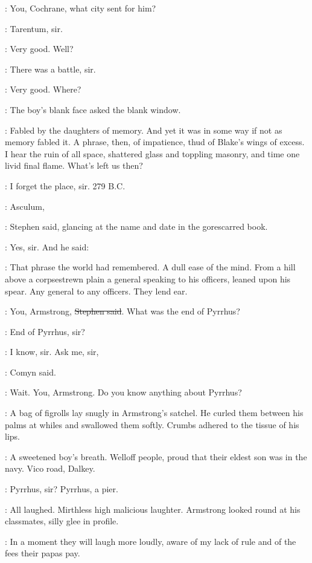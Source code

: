 \Stephen:
You, Cochrane, what city sent for him?

\cochrane:
Tarentum, sir.

\Stephen:
Very good. Well?

\cochrane:
There was a battle, sir.

\Stephen:
Very good.
Where?

:
The boy's blank face asked the blank window.

\StephenInt:
Fabled by the daughters of memory.
And yet it was in some way if not as memory fabled it.
A phrase, then, of impatience, thud of Blake's wings of excess.
I hear the ruin of all space, shattered glass and toppling masonry,
and time one livid final flame.
What's left us then?

\cochrane:
I forget the place, sir.
279 B.C.

\Stephen:
Asculum,

:
Stephen said, glancing at the name and date in the gorescarred book.

\cochrane:
Yes, sir.
And he said: 

\StephenInt:
That phrase the world had remembered.
A dull ease of the mind.
From a hill above a corpsestrewn plain
a general speaking to his officers, leaned upon his spear.
Any general to any officers.
They lend ear.

\Stephen:
You, Armstrong, \sout{Stephen said}.
What was the end of Pyrrhus?

\armstrong:
End of Pyrrhus, sir?

\comyn:
I know, sir.
Ask me, sir,

:
Comyn said.

\Stephen:
Wait.
You, Armstrong.
Do you know anything about Pyrrhus?

:
A bag of figrolls lay snugly in Armstrong's satchel.
He curled them between his palms at whiles and swallowed them softly.
Crumbs adhered to the tissue of his lips.

\StephenInt:
A sweetened boy's breath.
Welloff people, proud that their eldest son was in the navy.
Vico road, Dalkey.

\armstrong:
Pyrrhus, sir?
Pyrrhus, a pier.

:
All laughed.
Mirthless high malicious laughter.
Armstrong looked round at his classmates, silly glee in profile.

\StephenInt:
In a moment they will laugh more loudly,
aware of my lack of rule and of the fees their papas pay.

